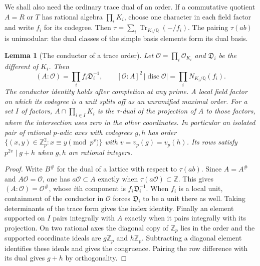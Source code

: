 \documentclass[11pt,reqno]{amsart}
\newtheorem{lemma}[theorem]{Lemma}
\theoremstyle{remark}\newtheorem{remark}[theorem]{Remark}
\numberwithin{equation}{section}
\begin{document}
We shall also need the ordinary trace dual of an order. If a commutative
quotient $A=R$ or $T$ has rational algebra $\prod_i K_i$, choose one
character in each field factor and write $f_i$ for its codegree.
Then $\tau=\sum_i\operatorname{Tr}_{K_i/\mathbb Q}(-/f_i)$. The
pairing $\tau(ab)$ is unimodular: the dual classes of the simple
basis elements form its dual basis.

\begin{lemma}[The conductor of a trace order]\label{lem:trace-order-conductor}
Let $\mathcal O=\prod_i\mathcal O_{K_i}$ and $\mathfrak D_i$ be
the different of $K_i$. Then
\[
 (A:\mathcal O)=\prod_i f_i\mathfrak D_i^{-1},\qquad
 [\mathcal O:A]^2\,|\operatorname{disc}\mathcal O|
        =\prod_i N_{K_i/\mathbb Q}(f_i).
\]
The conductor identity holds after completion at any prime. A local
field factor on which its codegree is a unit splits off as an
unramified maximal order. For a set $I$ of factors,
$A\cap\prod_{i\in I}K_i$ is the $\tau$-dual of the projection of
$A$ to those factors, where the intersection uses zero in the other
coordinates. In particular an isolated pair of rational $p$-adic axes
with codegrees $g,h$ has order
$\{(x,y)\in\mathbb Z_p^2:x\equiv y\pmod{p^v}\}$ with
$v=v_p(g)=v_p(h)$. Its rows satisfy $p^{2v}\mid g+h$ when $g,h$
are rational integers.
\end{lemma}
\begin{proof}
Write $B^\#$ for the dual of a lattice with respect to $\tau(ab)$.
Since $A=A^\#$ and $A\mathcal O=\mathcal O$, one has
$a\mathcal O\subset A$ exactly when $\tau(a\mathcal O)\subset\mathbb Z$.
This gives $(A:\mathcal O)=\mathcal O^\#$, whose $i$th component is
$f_i\mathfrak D_i^{-1}$. When $f_i$ is a local unit, containment of
the conductor in $\mathcal O$ forces $\mathfrak D_i$ to be a unit
there as well. Taking determinants of the trace form gives the index
identity. Finally an element supported on $I$ pairs integrally with
$A$ exactly when it pairs integrally with its projection. On two rational axes
the diagonal copy of $\mathbb Z_p$ lies in the order and the supported
coordinate ideals are $g\mathbb Z_p$ and $h\mathbb Z_p$. Subtracting a
diagonal element identifies these ideals and gives the congruence.
Pairing the row difference with its dual gives $g+h$ by orthogonality.
\end{proof}
\end{document}
